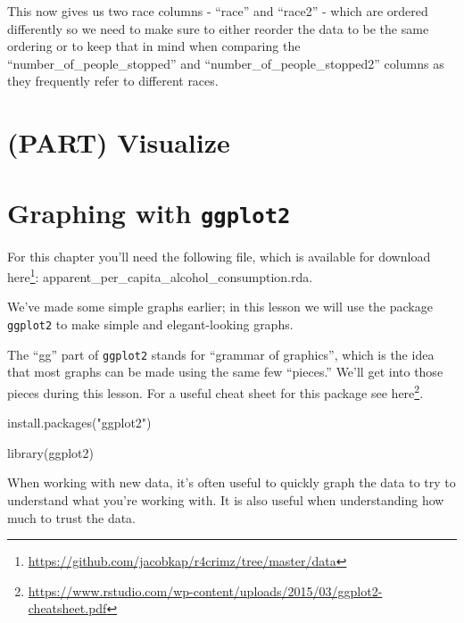\documentclass[
  a4paper,
]{krantz}
\makeatletter
\newenvironment{Shaded}{\begin{snugshade}}{\end{snugshade}}
\newcommand{\FunctionTok}[1]{\textcolor[rgb]{0.00,0.00,0.00}{#1}}
\newcommand{\NormalTok}[1]{#1}
\newcommand{\StringTok}[1]{\textcolor[rgb]{0.31,0.60,0.02}{#1}}
\renewcommand{\href}[2]{#2\footnote{\url{#1}}}
\newenvironment{kframe}{%
\medskip{}
\setlength{\fboxsep}{.8em}
 \def\at@end@of@kframe{}%
 \ifinner\ifhmode%
  \def\at@end@of@kframe{\end{minipage}}%
  \begin{minipage}{\columnwidth}%
 \fi\fi%
 \def\FrameCommand##1{\hskip\@totalleftmargin \hskip-\fboxsep
 \colorbox{shadecolor}{##1}\hskip-\fboxsep
     \hskip-\linewidth \hskip-\@totalleftmargin \hskip\columnwidth}%
 \MakeFramed {\advance\hsize-\width
   \@totalleftmargin\z@ \linewidth\hsize
   \@setminipage}}%
 {\par\unskip\endMakeFramed%
 \at@end@of@kframe}
\renewenvironment{Shaded}{\begin{kframe}}{\end{kframe}}
\makeatother
\begin{document}
This now gives us two race columns - ``race'' and ``race2''
- which are ordered differently so we need to make sure to
either reorder the data to be the same ordering or to keep
that in mind when comparing the
``number\_of\_people\_stopped'' and
``number\_of\_people\_stopped2'' columns as they frequently
refer to different races.

\hypertarget{part-visualize}{%
\chapter*{(PART) Visualize}\label{part-visualize}}

\hypertarget{graphing-intro}{%
\chapter{\texorpdfstring{Graphing with
\texttt{ggplot2}}{Graphing with ggplot2}}\label{graphing-intro}}

For this chapter you'll need the following file, which is
available for download
\href{https://github.com/jacobkap/r4crimz/tree/master/data}{here}:
apparent\_per\_capita\_alcohol\_consumption.rda.

We've made some simple graphs earlier; in this lesson we
will use the package \texttt{ggplot2} to make simple and
elegant-looking graphs.

The ``gg'' part of \texttt{ggplot2} stands for ``grammar of
graphics'', which is the idea that most graphs can be made
using the same few ``pieces.'' We'll get into those pieces
during this lesson. For a useful cheat sheet for this
package see
\href{https://www.rstudio.com/wp-content/uploads/2015/03/ggplot2-cheatsheet.pdf}{here}.

\begin{Shaded}
\begin{Highlighting}[]
\FunctionTok{install.packages}\NormalTok{(}\StringTok{"ggplot2"}\NormalTok{)}
\end{Highlighting}
\end{Shaded}

\begin{Shaded}
\begin{Highlighting}[]
\FunctionTok{library}\NormalTok{(ggplot2)}
\end{Highlighting}
\end{Shaded}

When working with new data, it's often useful to quickly
graph the data to try to understand what you're working
with. It is also useful when understanding how much to trust
the data.
\end{document}
